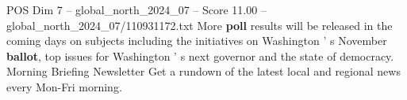 \begin{textsample}{POS Dim 7 – global\_north\_2024\_07 – Score 11.00 – global\_north\_2024\_07/110931172.txt}
More \textbf{poll} results will be released in the coming days on subjects including the initiatives on Washington ' s November \textbf{ballot}, top issues for Washington ' s next governor and the state of democracy.
Morning Briefing Newsletter Get a rundown of the latest local and regional news every Mon-Fri morning.

\end{textsample}
